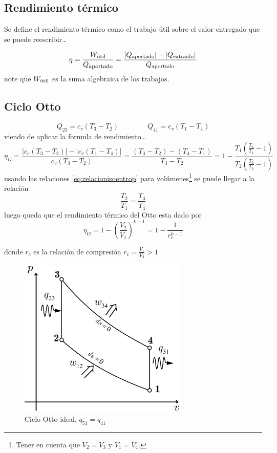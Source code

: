 \documentclass{article}
\newcommand{\ctegas}{k}
\newcommand{\rc}{r_c}
\newcommand{\util}{{\textrm{útil}}}
\newcommand{\Wutil}{W_{ \footnotesize \util}}
\begin{document}
\subsection{Rendimiento térmico}
Se define el rendimiento térmico como el trabajo útil sobre el calor entregado que se puede reescribir\ldots

\[
\eta = \frac{W_{ \footnotesize \util}}{Q_{\textrm{\footnotesize aportado}}}=\frac{|Q_{\footnotesize\textrm{aportado}}|-|Q_{\footnotesize\textrm{extraído}}|}{Q_{\footnotesize\textrm{aportado}}}
\]
note que $\Wutil$ es la suma algebraica de los trabajos.

\subsection{Ciclo Otto}
\[ 
Q_{23}=c_v(T_3-T_2) \qquad \qquad Q_{41}=c_v(T_1-T_4)
\]
viendo de aplicar la formula de rendimiento\ldots
\[
\eta_O=\frac{|c_v(T_3-T_2)|-|c_v(T_1-T_4)|}{c_v(T_3-T_2)}=\frac{(T_3-T_2)-(T_4-T_1)}{T_3-T_2}=1-\frac{T_1\left(\frac{T_4}{T_1}-1\right)}{T_2 \left( \frac{T_3}{T_2}-1\right)}
\]
usando las relaciones \eqref{eq:relacionisoentrop} para volúmenes\footnote{Tener en cuenta que $V_2=V_3$ y $V_1=V_4$.} se puede llegar a la relación 
\[
\frac{T_2}{T_1} = \frac{T_3}{T_4}
\]
luego queda que el rendimiento térmico del Otto esta dado por
\begin{equation}
    \eta_O=1-\left(\frac{V_2}{V_1}\right)^{\ctegas-1}=1-\frac{1}{\rc^{\ctegas-1}}
\end{equation}

donde $\rc$ es la relación de compresión $\rc=\frac{V_1}{V_2}>1$
\begin{figure}[htb!]
    \centering
    \includegraphics[width=8cm]{fig/ciclootto.eps}
    \caption{Ciclo Otto ideal. $q_{51}=q_{41}$}
    \label{fig:ottoideal}
\end{figure}
\end{document}
